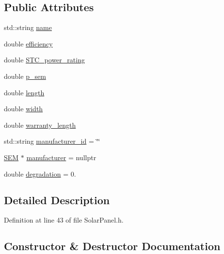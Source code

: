 \subsection*{Public Attributes}
\begin{DoxyCompactItemize}
\item 
std\+::string \hyperlink{classsolar__core_1_1_solar_module_abc9bb9bae1546dee017d598ef7baa952}{name}
\item 
double \hyperlink{classsolar__core_1_1_solar_module_a0303a0da750be23a4a408645d838ed24}{efficiency}
\item 
double \hyperlink{classsolar__core_1_1_solar_module_ada72a54d3a914a88fd3942f1a09065c1}{S\+T\+C\+\_\+power\+\_\+rating}
\item 
double \hyperlink{classsolar__core_1_1_solar_module_a34233be4549eb826fa5a4cc6a20993e3}{p\+\_\+sem}
\item 
double \hyperlink{classsolar__core_1_1_solar_module_a34cc7ce18770e51c87a3655f6f481be0}{length}
\item 
double \hyperlink{classsolar__core_1_1_solar_module_a72b5c417f88deb65818e96b5fcf52ef9}{width}
\item 
double \hyperlink{classsolar__core_1_1_solar_module_a88f461fc1142688294bf19ca02b7ec0d}{warranty\+\_\+length}
\item 
std\+::string \hyperlink{classsolar__core_1_1_solar_module_a24c71dfff1a0503fe967d11c52be05b8}{manufacturer\+\_\+id} = \char`\"{}\char`\"{}
\item 
\hyperlink{classsolar__core_1_1_s_e_m}{S\+E\+M} $\ast$ \hyperlink{classsolar__core_1_1_solar_module_a32c10820046565c531a3e1a0fd8107b0}{manufacturer} = nullptr
\item 
double \hyperlink{classsolar__core_1_1_solar_module_a9c6d7e0ef28958ac1da73a1e48a1373d}{degradation} = 0.
\end{DoxyCompactItemize}


\subsection{Detailed Description}


Definition at line 43 of file Solar\+Panel.\+h.



\subsection{Constructor \& Destructor Documentation}
\hypertarget{classsolar__core_1_1_solar_module_ae972f46a6c3bd9a1c3e7761ab1516524}{}
